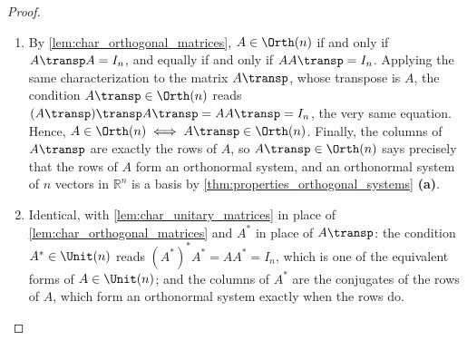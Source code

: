 \begin{proof}
\begin{enumerate}[label=\textbf{(\alph*)}]
    \item By \cref{lem:char_orthogonal_matrices}, $A \in \Orth(n)$ if and only if $A\transp A = I_n$, and equally if and only if $A A\transp = I_n$. Applying the same characterization to the matrix $A\transp$, whose transpose is $A$, the condition $A\transp \in \Orth(n)$ reads $(A\transp)\transp A\transp = A A\transp = I_n$, the very same equation. Hence, $A \in \Orth(n) \iff A\transp \in \Orth(n)$. Finally, the columns of $A\transp$ are exactly the rows of $A$, so $A\transp \in \Orth(n)$ says precisely that the rows of $A$ form an orthonormal system, and an orthonormal system of $n$ vectors in $\mathbb{R}^n$ is a basis by \cref{thm:properties_orthogonal_systems} \textbf{(a)}.
    \item Identical, with \cref{lem:char_unitary_matrices} in place of \cref{lem:char_orthogonal_matrices} and $A^*$ in place of $A\transp$: the condition $A^* \in \Unit(n)$ reads $(A^*)^* A^* = A A^* = I_n$, which is one of the equivalent forms of $A \in \Unit(n)$; and the columns of $A^*$ are the conjugates of the rows of $A$, which form an orthonormal system exactly when the rows do. \qedhere
\end{enumerate}
\end{proof}

